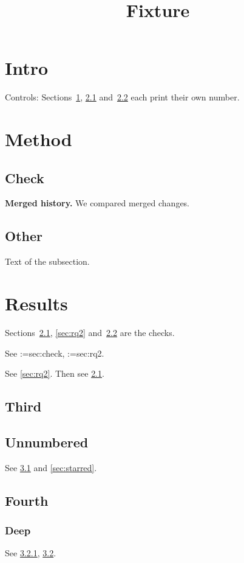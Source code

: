 \documentclass[conference]{IEEEtran}
\makeatletter
\newcommand{\cref}[1]{\@for\@key:=#1\do{\ref{\@key}\ }}
\makeatother
\begin{document}
\title{Fixture}
\maketitle

\section{Intro}\label{sec:intro}
Controls: Sections~\ref{sec:intro}, \ref{sec:check} and~\ref{sec:other} each print their own number.

\section{Method}\label{sec:method}
\subsection{Check}\label{sec:check}
\textbf{Merged history.}\label{sec:rq2} We compared merged changes.
\subsection{Other}\label{sec:other}
Text of the subsection.

\section{Results}\label{sec:results}
Sections~\ref{sec:check}, \ref{sec:rq2} and~\ref{sec:other} are the checks.

See \cref{sec:check}, \cref{sec:rq2}.

See \ref{sec:rq2}. Then see \ref{sec:check}.

\subsection{Third}\label{sec:third}
\subsection*{Unnumbered}\label{sec:starred}
See \ref{sec:third} and \ref{sec:starred}.

\subsection{Fourth}\label{sec:fourth}
\subsubsection{Deep}\label{sec:deep}
See \ref{sec:deep}, \ref{sec:fourth}.
\end{document}
